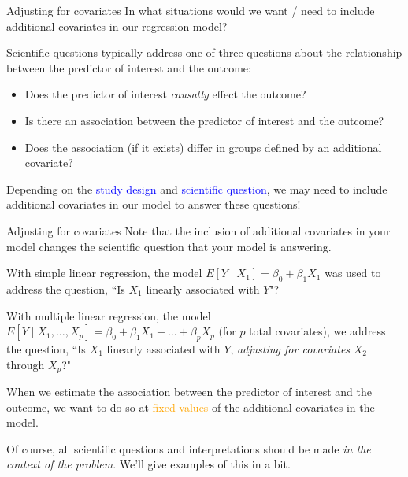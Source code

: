 \documentclass[10pt,t]{beamer}
\begin{document}
\begin{frame}{Adjusting for covariates}
In what situations would we want / need to include additional covariates in our regression model?

\vspace{0.3cm}

Scientific questions typically address one of three questions about the relationship between the predictor of interest and the outcome:

\vspace{0.3cm}

\begin{itemize}
	\item Does the predictor of interest \textit{causally} effect the outcome?
	\item Is there an association between the predictor of interest and the outcome?
	\item Does the association (if it exists) differ in groups defined by an additional covariate?
\end{itemize} \pause

\vspace{0.3cm}

Depending on the \textcolor{blue}{study design} and \textcolor{blue}{scientific question}, we may need to include additional covariates in our model to answer these questions!

\end{frame}

\begin{frame}{Adjusting for covariates}
Note that the inclusion of additional covariates in your model changes the scientific question that your model is answering.

\vspace{0.3cm}

With simple linear regression, the model $E[Y \mid X_1] = \beta_0 + \beta_1 X_1$ was used to address the question, ``Is $X_1$ linearly associated with $Y$"?  \pause

\vspace{0.3cm}

With multiple linear regression, the model $E[Y \mid X_1, \dots, X_p] = \beta_0 + \beta_1 X_1 + \dots + \beta_p X_p$ (for $p$ total covariates), we address the question, ``Is $X_1$ linearly associated with $Y$, \textit{adjusting for covariates} $X_2$ through $X_p$?" \pause

\vspace{0.3cm}

When we estimate the association between the predictor of interest and the outcome, we want to do so at \textcolor{orange}{fixed values} of the additional covariates in the model. \pause

\vspace{0.3cm}

Of course, all scientific questions and interpretations should be made \textit{in the context of the problem}. We'll give examples of this in a bit.
\end{frame}
\end{document}
